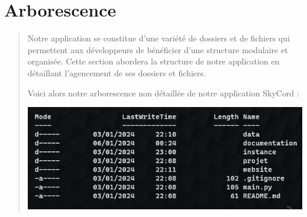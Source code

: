 \documentclass{article}
\begin{document}
\newpage
{}
\section*{Arborescence}

\begin{quote}
    
    \begin{center}
        \begin{minipage}{\linewidth}
            Notre application se constitue d'une variété de dossiers et de fichiers qui permettent aux développeurs de bénéficier d'une structure modulaire et organisée. Cette section abordera la structure de notre application en détaillant l'agencement de ses dossiers et fichiers.
    
            Voici alors notre arborescence non détaillée de notre application SkyCord :
    \vspace*{1\baselineskip}
    \begin{center}
                \includegraphics[]{image/arborescence.png}
            \end{center}
    

\end{minipage}
\end{center}
\end{quote}
\end{document}
